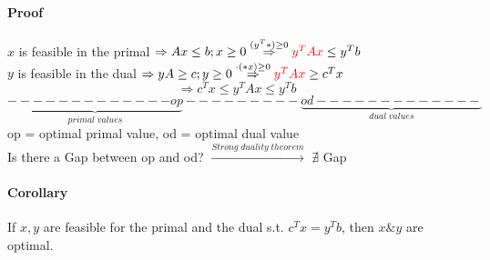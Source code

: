 \paragraph{Proof} $x$ is feasible in the primal $\Rightarrow Ax \leq b; x \geq 0 \stackrel{ (y^T*)\geq 0}{\Rightarrow} \textcolor{red}{y^TAx} \leq y^Tb$ \\
$y$ is feasible in the dual $\Rightarrow yA \geq c; y \geq 0 \stackrel{\cdot (*x) \geq 0}{\Rightarrow} \textcolor{red}{y^TAx} \geq c^Tx$ 
$$\Rightarrow c^Tx \leq y^TAx \leq y^Tb	$$
$$\underbrace{-------------op}_{primal \; values}---------\underbrace{od-------------}_{dual \; values}$$
op = optimal primal value, od = optimal dual value \\
Is there a Gap between op and od? $\stackrel{Strong \; duality \; theorem}{\longrightarrow}$ $\nexists$ Gap

\paragraph{Corollary} If $x,y$ are feasible for the primal and the dual s.t. $c^Tx = y^Tb$, then $x\&y$ are optimal.